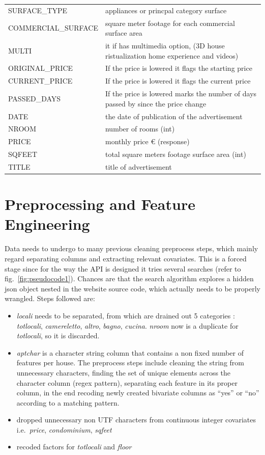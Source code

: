 \documentclass[
  12pt,
  a4paper,
  oneside]{book}
\providecommand{\tightlist}{%
  \setlength{\itemsep}{0pt}\setlength{\parskip}{0pt}}
\theoremstyle{definition}
\theoremstyle{definition}
\theoremstyle{definition}
\theoremstyle{remark}
\begin{document}
\begin{longtable}{ll}
SURFACE\_TYPE & appliances or princpal category surface\\
COMMERCIAL\_SURFACE & square meter footage for each commercial surface area\\
\addlinespace
MULTI & it if has multimedia option, (3D house ristualization home experience and videos)\\
ORIGINAL\_PRICE & If the price is lowered it flags the starting price\\
CURRENT\_PRICE & If the price is lowered it flags the current price\\
PASSED\_DAYS & If the price is lowered marks the number of days passed by since the price change\\
DATE & the date of publication of the advertisement\\
\addlinespace
NROOM & number of rooms (int)\\
PRICE & monthly price € (response)\\
SQFEET & total square meters footage surface area (int)\\
TITLE & title of advertisement\\
\bottomrule
\end{longtable}

\hypertarget{prep}{%
\section{Preprocessing and Feature Engineering}\label{prep}}

Data needs to undergo to many previous cleaning preprocess steps, which mainly regard separating columns and extracting relevant covariates. This is a forced stage since for the way the API is designed it tries several searches (refer to fig.~\ref{fig:pseudocode1}). Chances are that the search algorithm explores a hidden json object nested in the website source code, which actually needs to be properly wrangled. Steps followed are:

\begin{itemize}
\tightlist
\item
  \emph{locali} needs to be separated, from which are drained out 5 categories : \emph{totlocali}, \emph{camereletto}, \emph{altro}, \emph{bagno}, \emph{cucina}. \emph{nroom} now is a duplicate for \emph{totlocali}, so it is discarded.
\item
  \emph{aptchar} is a character string column that contains a non fixed number of features per house. The preprocess steps include cleaning the string from unnecessary characters, finding the set of unique elements across the character column (regex pattern), separating each feature in its proper column, in the end recoding newly created bivariate columns as ``yes'' or ``no'' according to a matching pattern.
\item
  dropped unnecessary non UTF characters from continuous integer covariates i.e.~\emph{price}, \emph{condominium}, \emph{sqfeet}
\item
  recoded factors for \emph{totlocali} and \emph{floor}
\end{itemize}
\end{document}
